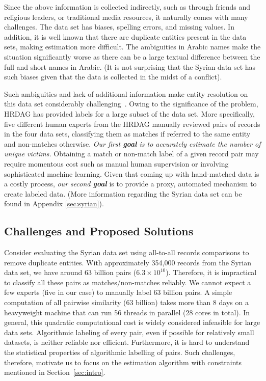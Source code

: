 \documentclass{imsart}
\begin{document}

Since the above information is collected indirectly, such as through friends and religious leaders, or traditional media resources, it naturally comes with many challenges. The data set has biases, spelling errors, and missing values. In addition, it is well known that there are duplicate entities present in the data sets, making estimation more difficult.
The ambiguities in Arabic names make the situation significantly worse as there can be a large textual difference between the full and short names in Arabic. (It is not surprising that the Syrian data set has such biases given that the data is collected in the midst of a conflict).

Such ambiguities and lack of additional information make entity resolution on this data set considerably challenging~\citep{price2014updated}. Owing to the significance of the problem, HRDAG has provided labels for a large subset of the data set. More specifically, five different human experts from the HRDAG manually reviewed pairs of records in the four data sets, classifying them as matches if referred to the same entity and non-matches otherwise. {\em Our first {\bf goal} is to accurately estimate the number of unique victims.} Obtaining a match or non-match label of a given record pair may require momentous cost such as manual human supervision or involving sophisticated machine learning. Given that coming up with hand-matched data is a costly process,  {\em our second {\bf goal}} is to provide a proxy, automated mechanism to create labeled data. (More information regarding the Syrian data set can be found in Appendix \ref{sec:syrian}).

\subsection{Challenges and Proposed Solutions}
\label{sec:SyriaChallenges}
Consider evaluating the Syrian data set using all-to-all records comparisons to remove duplicate entities. With approximately 354,000 records from the Syrian data set, we have around 63 billion pairs ($6.3 \times 10^{10}$). Therefore, it is impractical to classify all these pairs as matches/non-matches reliably. We cannot expect a few experts (five in our case) to manually label 63 billion pairs. A simple computation of all pairwise similarity (63 billion) takes more than 8 days on a heavyweight machine that can run 56 threads in parallel (28 cores in total). In general, this quadratic computational cost is widely considered infeasible for large data sets. Algorithmic labeling of every pair, even if possible for relatively small datasets, is neither reliable nor efficient. Furthermore, it is hard to understand the statistical properties of algorithmic labelling of pairs. Such challenges, therefore, motivate us to focus on the estimation algorithm with constraints mentioned in Section~\ref{sec:intro}.
\end{document}
